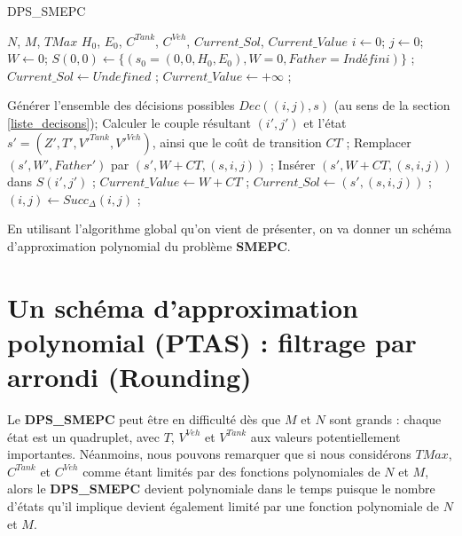 \begin{algorithm} 
	\caption{DPS\_SMEPC}
	\label{algo_DPS_SMEPC}
	\begin{algorithmic}[1]
		\REQUIRE $N$, $M$, $TMax$ $H_0$, $E_0$, $C^{Tank}$, $C^{Veh}$,
		\ENSURE $Current\_Sol$, $Current\_Value$
 		\hline
		\vspace{0.5cm}
		\INITIALISATION
		\STATE $i \leftarrow 0$; $j \leftarrow 0$; $W \leftarrow 0$;
		\STATE $S(0,0) \leftarrow \{(s_0=(0,0,H_0,E_0), W=0, Father=Indéfini)\}$ ;
		\STATE $Current\_Sol \leftarrow Undefined$ ; $Current\_Value \leftarrow +\infty$ ;
		\vspace{0.3cm}
		
		\BOUCLEPRINCIPAL
		\vspace{0.2cm}
		\STATE Générer l'ensemble des décisions possibles $Dec((i,j),s)$ (au sens de la section \ref{liste_decisons});
		\STATE Calculer le couple résultant $(i',j')$ et l'état $s'=(Z',T',V'^{Tank}, V'^{Veh})$, ainsi que le coût de transition $CT$ ; 
		\STATE Remplacer $(s', W', Father')$ par $(s', W+CT, (s,i,j))$ ;
		\ELSE
		\STATE Insérer $(s', W+CT, (s,i,j))$ dans $S(i',j')$ ;
		\ENDIF
		\STATE $Current\_Value \leftarrow W+CT$ ;
		\STATE $Current\_Sol \leftarrow (s', (s,i,j))$ ;
		\ENDIF
		\ENDFOR
		\ENDFOR
		\STATE $(i, j) \leftarrow Succ_{\Delta}(i,j)$ ;
		\ENDWHILE
	\end{algorithmic}
\end{algorithm}
En utilisant l'algorithme global qu'on vient de présenter, on va donner un schéma d'approximation polynomial du problème \textbf{SMEPC}. 
\section{Un schéma d'approximation polynomial (PTAS) : filtrage par arrondi (Rounding)}
\label{Rounding_filter}

Le \textbf{DPS\_SMEPC} peut être en difficulté dès que $M$ et $N$ sont grands : chaque état est un quadruplet, avec $T$, $V^{Veh}$ et $V^{Tank}$ aux valeurs potentiellement importantes. Néanmoins, nous pouvons remarquer que si nous considérons $TMax$, $C^{Tank}$ et $C^{Veh}$ comme étant limités par des fonctions polynomiales de $N$ et $M$, alors le \textbf{DPS\_SMEPC} devient polynomiale dans le temps puisque le nombre d'états qu'il implique devient également limité par une fonction polynomiale de $N$ et $M$.

